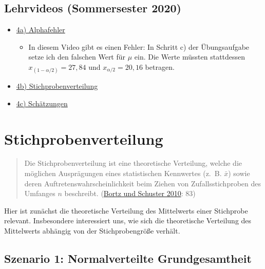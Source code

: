 \documentclass[
  11pt,
  ngerman,
  a4paper,
]{report}
\providecommand{\tightlist}{%
  \setlength{\itemsep}{0pt}\setlength{\parskip}{0pt}}
\begin{document}
\hypertarget{lehrvideos-sommersester-2020}{%
\subsection*{Lehrvideos (Sommersester 2020)}\label{lehrvideos-sommersester-2020}}

\begin{itemize}
\tightlist
\item
  \href{https://video01.uni-frankfurt.de/Mediasite/Play/7f5b3002871a4b18859db90d937e5f8a1d}{4a) Alphafehler}

  \begin{itemize}
  \tightlist
  \item
    In diesem Video gibt es einen Fehler: In Schritt c) der Übungsaufgabe setze ich den falschen Wert für \(\mu\) ein. Die Werte müssten stattdessen \(x_{(1-\alpha/2)}=27{,}84\) und \(x_{\alpha/2}=20{,}16\) betragen.
  \end{itemize}
\item
  \href{https://video01.uni-frankfurt.de/Mediasite/Play/393be1f574c643f9a045a6b4cc60a4511d}{4b) Stichprobenverteilung}
\item
  \href{https://video01.uni-frankfurt.de/Mediasite/Play/ace60129a0c94894a66349f56e0b24a31d}{4c) Schätzungen}
\end{itemize}

\hypertarget{stichprobenverteilung}{%
\section{Stichprobenverteilung}\label{stichprobenverteilung}}

\begin{quote}
Die Stichprobenverteilung ist eine theoretische Verteilung, welche die möglichen Ausprägungen eines statistischen Kennwertes (z.~B. \(\bar{x}\)) sowie deren Auftretenswahrscheinlichkeit beim Ziehen von Zufallsstichproben des Umfanges \(n\) beschreibt. (\protect\hyperlink{ref-bortz}{Bortz und Schuster 2010}: 83)
\end{quote}

Hier ist zunächst die theoretische Verteilung des Mittelwerts einer Stichprobe relevant. Insbesondere interessiert uns, wie sich die theoretische Verteilung des Mittelwerts abhängig von der Stichprobengröße verhält.

\hypertarget{szenario-1-normalverteilte-grundgesamtheit}{%
\subsection{Szenario 1: Normalverteilte Grundgesamtheit}\label{szenario-1-normalverteilte-grundgesamtheit}}
\end{document}
